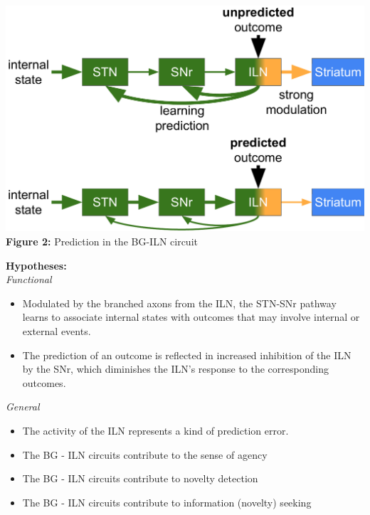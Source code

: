 \documentclass[portrait,final,a0paper,fontscale=0.30]{baposter}
\begin{document}
\begin{poster}
{\begin{adjustbox}{minipage=\textwidth, margin=2pt, center}
\begin{minipage}{0.25\textwidth}
        \includegraphics[width=\textwidth]{figures/circuit_idea_2.pdf}
        \textbf{Figure 2:} Prediction in the BG-ILN circuit
    \end{minipage}
    \hspace{0.01\textwidth}
    \begin{minipage}{0.2\textwidth}
        \textbf{Hypotheses:}\\
        \textit{Functional}
        \begin{itemize}
            \item Modulated by the branched axons from the ILN, the STN-SNr pathway learns to associate internal states with outcomes that may involve internal or external events.
            \item The prediction of an outcome is reflected in increased inhibition of the ILN by the SNr, which diminishes the ILN's response to the corresponding outcomes.
        \end{itemize}
        \textit{General}
        \begin{itemize}
            \item The activity of the ILN represents a kind of prediction error.
            \item The BG - ILN circuits contribute to the sense of agency
            \item The BG - ILN circuits contribute to novelty detection
            \item The BG - ILN circuits contribute to information (novelty) seeking
        \end{itemize}        
    \end{minipage}
    \hfill

\end{adjustbox}
}




\end{poster}
\end{document}
